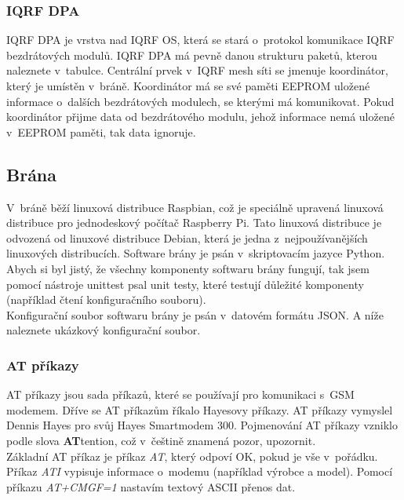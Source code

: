 \documentclass[12pt,a4paper,oneside]{article}
\begin{document}
\subsubsection{IQRF DPA}

IQRF DPA je vrstva nad IQRF OS, která se stará o~protokol komunikace IQRF bezdrátových modulů. IQRF DPA má pevně danou strukturu paketů, kterou naleznete v~tabulce. Centrální prvek v~IQRF mesh síti se jmenuje koordinátor, který je umístěn v~bráně. Koordinátor má se své paměti EEPROM uložené informace o~dalších bezdrátových modulech, se kterými má komunikovat. Pokud koordinátor přijme data od bezdrátového modulu, jehož informace nemá uložené v~EEPROM paměti, tak data ignoruje.

\subsection{Brána}

V~bráně běží linuxová distribuce Raspbian, což je speciálně upravená linuxová distribuce pro jednodeskový počítač Raspberry Pi. Tato linuxová distribuce je odvozená od linuxové distribuce Debian, která je jedna z~nejpoužívanějších linuxových distribucích. Software brány je psán v~skriptovacím jazyce Python. Abych si byl jistý, že všechny komponenty softwaru brány fungují, tak jsem pomocí nástroje unittest psal unit testy, které testují důležité komponenty (například čtení konfiguračního souboru). \\

Konfigurační soubor softwaru brány je psán v~datovém formátu JSON. A níže naleznete ukázkový konfigurační soubor.

\subsubsection{AT příkazy}

AT příkazy jsou sada příkazů, které se používají pro komunikaci s~GSM modemem. Dříve se AT příkazům říkalo Hayesovy příkazy. AT příkazy vymyslel Dennis Hayes pro svůj Hayes Smartmodem 300. Pojmenování AT příkazy vzniklo podle slova \textbf{AT}tention, což v~češtině znamená pozor, upozornit. \\

Základní AT příkaz je příkaz \textit{AT}, který odpoví OK, pokud je vše v~pořádku. Příkaz \textit{ATI} vypisuje informace o~modemu (například výrobce a model). Pomocí příkazu \textit{AT+CMGF=1} nastavím textový ASCII přenos dat. \\
\end{document}
